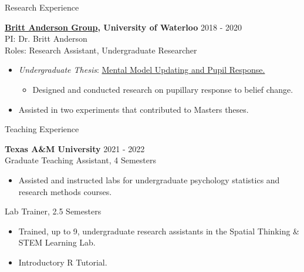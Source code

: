\documentclass{resume} %
\begin{document}
\begin{rSection}{Research Experience}
\begin{itemize}[nosep]
    \end{itemize}
    
    {\bf \href{https://brittlab.uwaterloo.ca/}{Britt Anderson Group}, 
        University of Waterloo}
    \hfill {2018 - 2020}
    \\PI: Dr. Britt Anderson
    \\Roles: Research Assistant, Undergraduate Researcher
    
    \begin{itemize}[nosep]
        
        \item \emph{Undergraduate Thesis}: 
        \href{https://github.com/sjp117/Undergrad_Projects/tree/master/mentalModelUpdatingPupil}{Mental
         Model Updating and Pupil Response.}
            \begin{itemize}
                \item Designed and conducted research on pupillary response to 
                belief change.
            \end{itemize}
        \item Assisted in two experiments that contributed to Masters theses.
        
    \end{itemize}
    
\end{rSection}


\begin{rSection}{Teaching Experience}
    
    {\bf {Texas A\&M University}}
    \hfill {2021 - 2022}
    \\Graduate Teaching Assistant, 4 Semesters
    
    \begin{itemize}[nosep]
        
        \item Assisted and instructed labs for undergraduate psychology 
        statistics and research methods courses.
        
    \end{itemize}

    Lab Trainer, 2.5 Semesters
    
    \begin{itemize}[nosep]
        
        \item Trained, up to 9, undergraduate research assistants in the 
        Spatial Thinking \& STEM Learning Lab.
        \item Introductory R Tutorial.
        
    \end{itemize}
    
\end{rSection}
\end{document}
